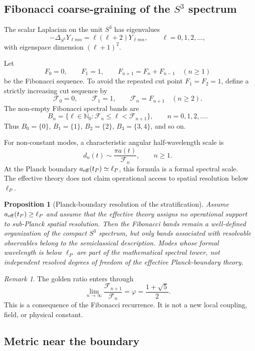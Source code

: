 \documentclass[reprint,aps,prd,letterpaper,superscriptaddress,nofootinbib,longbibliography,floatfix]{revtex4-2}
\newtheorem{proposition}[theorem]{Proposition}
\theoremstyle{remark}
\newtheorem{remark}[theorem]{Remark}
\begin{document}
\subsection{Fibonacci coarse-graining of the \texorpdfstring{$S^3$}{S3} spectrum}

The scalar Laplacian on the unit \(S^3\) has eigenvalues
\[
  -\Delta_{S^3}Y_{\ell mn}=\ell(\ell+2)Y_{\ell mn},
  \qquad \ell=0,1,2,\ldots ,
\]
with eigenspace dimension \((\ell+1)^2\).

Let
\[
  F_0=0,\qquad F_1=1,\qquad F_{n+1}=F_n+F_{n-1}\quad(n\ge1)
\]
be the Fibonacci sequence.  To avoid the repeated cut point \(F_1=F_2=1\), define
a strictly increasing cut sequence by
\[
  \mathcal F_0=0,\qquad
  \mathcal F_1=1,\qquad
  \mathcal F_n=F_{n+1}\quad(n\ge2).
\]
The non-empty Fibonacci spectral bands are
\[
  B_n=\{\ell\in\mathbb N_0:\mathcal F_n\leq \ell<\mathcal F_{n+1}\},
  \qquad n=0,1,2,\ldots .
\]
Thus \(B_0=\{0\}\), \(B_1=\{1\}\), \(B_2=\{2\}\), \(B_3=\{3,4\}\), and so on.

For non-constant modes, a characteristic angular half-wavelength scale is
\[
  d_n(t)\sim \frac{\pi a(t)}{\mathcal F_n},
  \qquad n\ge1 .
\]
At the Planck boundary \(a_{\rm eff}(t_P)\simeq\ell_P\), this formula is a formal
spectral scale.  The effective theory does not claim operational access to
spatial resolution below \(\ell_P\).

\begin{proposition}[Planck-boundary resolution of the stratification]
\label{prop:resolution}
Assume \(a_{\rm eff}(t_P)\ge\ell_P\) and assume that the effective theory assigns
no operational support to sub-Planck spatial resolution.  Then the Fibonacci
bands remain a well-defined organization of the compact \(S^3\) spectrum, but
only bands associated with resolvable observables belong to the semiclassical
description.  Modes whose formal wavelength is below \(\ell_P\) are part of the
mathematical spectral tower, not independent resolved degrees of freedom of the
effective Planck-boundary theory.
\end{proposition}

\begin{remark}
The golden ratio enters through
\[
  \lim_{n\to\infty}\frac{\mathcal F_{n+1}}{\mathcal F_n}
  =\varphi=\frac{1+\sqrt5}{2}.
\]
This is a consequence of the Fibonacci recurrence.  It is not a new local
coupling, field, or physical constant.
\end{remark}

\subsection{Metric near the boundary}
\end{document}
